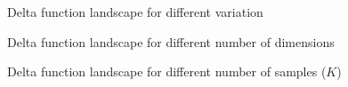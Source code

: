 \documentclass{article}
\begin{document}
\begin{figure}[!htbp]
  \hspace*{-2.8cm}
  \caption{Delta function landscape for different variation}
  \label{fig:delta_random_sigma}
\end{figure}

\begin{figure}[!htbp]
  \hspace*{-2.8cm}
  \caption{Delta function landscape for different number of dimensions}
  \label{fig:delta_random_dim}
\end{figure}

\begin{figure}[!htbp]
  \hspace*{-2.8cm}
  \caption{Delta function landscape for different number of samples ($K$)}
  \label{fig:delta_random_samples}
\end{figure}
\end{document}
